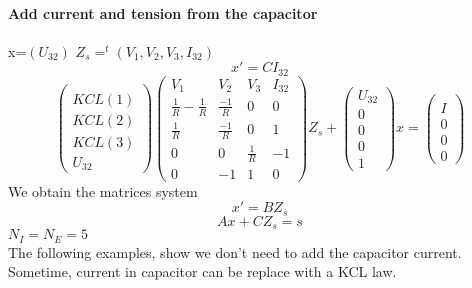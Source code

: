 \documentclass[10pt]{article}
\begin{document}
\paragraph{Add current and tension from the capacitor}
x=$(U_{32})$
$Z_{s}=^{t}(V_{1},V_{2},V_{3},I_{32})$\\
\[x'=CI_{32}\]
\[\left(\begin{array}{c}
  \\
  KCL(1)\\
  KCL(2)\\
  KCL(3)\\
  U_{32}
  \end{array}\right)
\left(\begin{array}{cccc}
  V_{1}&V_{2}&V_{3}&I_{32}\\
  \hline
  \frac{1}{R}-\frac{1}{R}&  \frac{-1}{R}&0&0\\
  \frac{1}{R}&  \frac{-1}{R}&0&1\\
  0&0&\frac{1}{R}&-1\\
  0&-1&1&0
\end{array}\right)Z_{s}+
\left(\begin{array}{c}
  U_{32}\\
  \hline
  0\\
  0\\
  0\\
  1
  \end{array}\right)x
=
\left(\begin{array}{c}
  \\
  I\\
  0\\
  0\\
  0
  \end{array}\right)
\]
We obtain the matrices system\\
\[x'=BZ_{s}\]
\[Ax+CZ_{s}=s\]
$N_{I}=N_{E}=5$\\
The following examples, show we don't need to add the capacitor current. Sometime, current in
capacitor can be replace with a KCL law.\\
\end{document}
